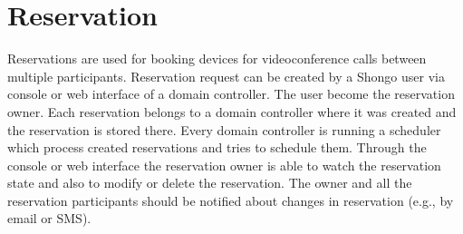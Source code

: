 \chapter{Reservation}

Reservations are used for booking devices for videoconference calls between multiple participants. Reservation request can be created by a Shongo user via console or web interface of a domain controller. The user become the reservation owner. Each reservation belongs to a domain controller where it was created and the reservation is stored there. Every domain controller is running a scheduler which process created reservations and tries to schedule them. Through the console or web interface the reservation owner is able to watch the reservation state and also to modify or delete the reservation. The owner and all the reservation participants should be notified about changes in reservation (e.g., by email or SMS). 

